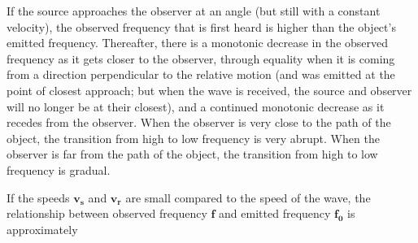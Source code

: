\documentclass{book}
\begin{document}
If the source approaches the observer at an angle (but still with a constant velocity), the observed frequency that is first heard is higher than the object's emitted frequency. Thereafter, there is a monotonic decrease in the observed frequency as it gets closer to the observer, through equality when it is coming from a direction perpendicular to the relative motion (and was emitted at the point of closest approach; but when the wave is received, the source and observer will no longer be at their closest), and a continued monotonic decrease as it recedes from the observer. When the observer is very close to the path of the object, the transition from high to low frequency is very abrupt. When the observer is far from the path of the object, the transition from high to low frequency is gradual.

If the speeds $\mathbf{v_\text{s}}$ and $\mathbf{v_\text{r}}$ are small compared to the speed of the wave, the relationship between observed frequency $\mathbf{f}$ and emitted frequency $\mathbf{f_0}$ is approximately
\end{document}
